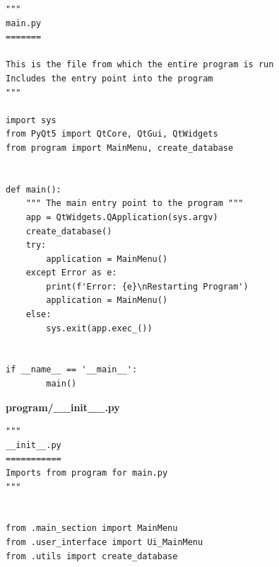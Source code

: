 \documentclass{article}
\begin{document}
\begin{lstlisting}
"""
main.py
=======

This is the file from which the entire program is run
Includes the entry point into the program
"""

import sys
from PyQt5 import QtCore, QtGui, QtWidgets
from program import MainMenu, create_database


def main():
    """ The main entry point to the program """
    app = QtWidgets.QApplication(sys.argv)
    create_database()
    try:
        application = MainMenu()
    except Error as e:
        print(f'Error: {e}\nRestarting Program')
        application = MainMenu()
    else:
        sys.exit(app.exec_())


if __name__ == '__main__':
        main()
\end{lstlisting}

\textbf{program/\_\_init\_\_.py}
\begin{lstlisting}
"""
__init__.py
===========
Imports from program for main.py
"""


from .main_section import MainMenu
from .user_interface import Ui_MainMenu
from .utils import create_database
\end{lstlisting}
\end{document}
